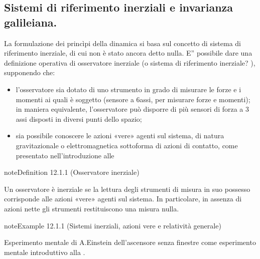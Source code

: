 \documentclass[letterpaper,10pt,italian]{jupyterBook}
\begin{document}
\subsection{Sistemi di riferimento inerziali e invarianza galileiana.}
\label{\detokenize{ch/mechanics/dynamics-principles:sistemi-di-riferimento-inerziali-e-invarianza-galileiana}}\label{\detokenize{ch/mechanics/dynamics-principles:physics-hs-mechanics-dynamics-principles-inertial-ref-frame}}
\sphinxAtStartPar
La formulazione dei princìpi della dinamica si basa sul concetto di sistema di riferimento inerziale, di cui non è stato ancora detto nulla.
E” possibile dare una definizione operativa di osservatore inerziale (o sistema di riferimento inerziale? ), supponendo che:
\begin{itemize}
\item {} 
\sphinxAtStartPar
l’osservatore sia dotato di uno strumento in grado di misurare le forze e i momenti ai quali è soggetto (sensore a 6\sphinxhyphen{}assi, per misurare forze e momenti); in maniera equivalente, l’osservatore può disporre di più sensori di forza a 3 assi disposti in diversi punti dello spazio;

\item {} 
\sphinxAtStartPar
sia possibile conoscere le azioni «vere» agenti sul sistema, di natura gravitazionale o elettromagnetica sottoforma di azioni di contatto, come presentato nell’introduzione alle {\hyperref[\detokenize{ch/mechanics/actions:physics-hs-mechanics-actions}]{}}

\end{itemize}
\label{ch/mechanics/dynamics-principles:inertial-observer}
\begin{sphinxadmonition}{note}{Definition 12.1.1 (Osservatore inerziale)}



\sphinxAtStartPar
Un osservatore è inerziale se la lettura degli strumenti di misura in suo possesso corrisponde alle azioni «vere» agenti sul sistema. In particolare, in assenza di azioni nette gli strumenti restituiscono una misura nulla.
\end{sphinxadmonition}
\label{ch/mechanics/dynamics-principles:example-1}
\begin{sphinxadmonition}{note}{Example 12.1.1 (Sistemi inerziali, azioni vere e relatività generale)}



\sphinxAtStartPar
Esperimento mentale di A.Einstein dell’ascensore senza finestre come esperimento mentale introduttivo alla {\hyperref[\detokenize{ch/modern/einstein:physics-hs-modern-einstein-general}]{}}.
\end{sphinxadmonition}
\end{document}
